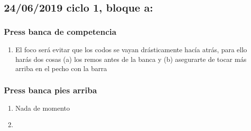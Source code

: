 \documentclass[11pt]{article}
\begin{document}
\subsection{24/06/2019 ciclo 1, bloque a:}
\label{sec:org1b51c51}
\subsubsection{Press banca de competencia}
\label{sec:org1cc89fc}
\begin{enumerate}
\item El foco será evitar que los codos se vayan drásticamente hacía
atrás, para ello harás dos cosas (a) los remos antes de la banca y
(b) asegurarte de tocar más arriba en el pecho con la barra
\end{enumerate}
\subsubsection{Press banca pies arriba}
\label{sec:org0fd2d8c}
\begin{enumerate}
\item Nada de momento
\item 
\end{enumerate}
\end{document}

